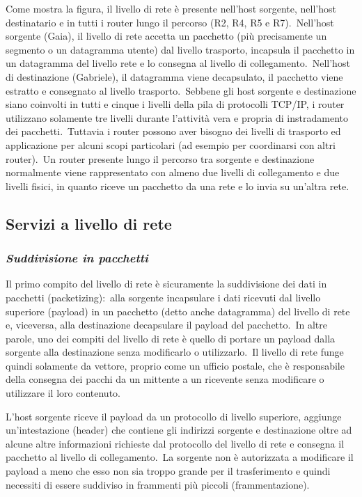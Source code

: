 Come mostra la figura, il livello di rete è presente nell'host sorgente, nell'host destinatario e in tutti i router lungo il percorso (R2, R4, R5 e R7).\
Nell'host sorgente (Gaia), il livello di rete accetta un pacchetto (più precisamente un segmento o un datagramma utente) dal livello trasporto, incapsula il pacchetto in un datagramma del livello rete e lo consegna al livello di collegamento.\
Nell'host di destinazione (Gabriele), il datagramma viene decapsulato, il pacchetto viene estratto e consegnato al livello trasporto.\
Sebbene gli host sorgente e destinazione siano coinvolti in tutti e cinque i livelli della pila di protocolli TCP/IP, i router utilizzano solamente tre livelli durante l'attività vera e propria di instradamento dei pacchetti.\
Tuttavia i router possono aver bisogno dei livelli di trasporto ed applicazione per alcuni scopi particolari (ad esempio per coordinarsi con altri router).\
Un router presente lungo il percorso tra sorgente e destinazione normalmente viene rappresentato con almeno due livelli di collegamento e due livelli fisici, in quanto riceve un pacchetto da una rete e lo invia su un'altra rete.

\subsection{Servizi a livello di rete}

\subsubsection{\emph{Suddivisione in pacchetti}}

Il primo compito del livello di rete è sicuramente la suddivisione dei dati in pacchetti (packetizing):\ alla sorgente incapsulare i dati ricevuti dal livello superiore (payload) in un pacchetto (detto anche datagramma) del livello di rete e, viceversa, alla destinazione decapsulare il payload del pacchetto.\
In altre parole, uno dei compiti del livello di rete è quello di portare un payload dalla sorgente alla destinazione senza modificarlo o utilizzarlo.\
Il livello di rete funge quindi solamente da vettore, proprio come un ufficio postale, che è responsabile della consegna dei pacchi da un mittente a un ricevente senza modificare o utilizzare il loro contenuto.

L'host sorgente riceve il payload da un protocollo di livello superiore, aggiunge un'intestazione (header) che contiene gli indirizzi sorgente e destinazione oltre ad alcune altre informazioni richieste dal protocollo del livello di rete e consegna il pacchetto al livello di collegamento.\
La sorgente non è autorizzata a modificare il payload a meno che esso non sia troppo grande per il trasferimento e quindi necessiti di essere suddiviso in frammenti più piccoli (frammentazione).

